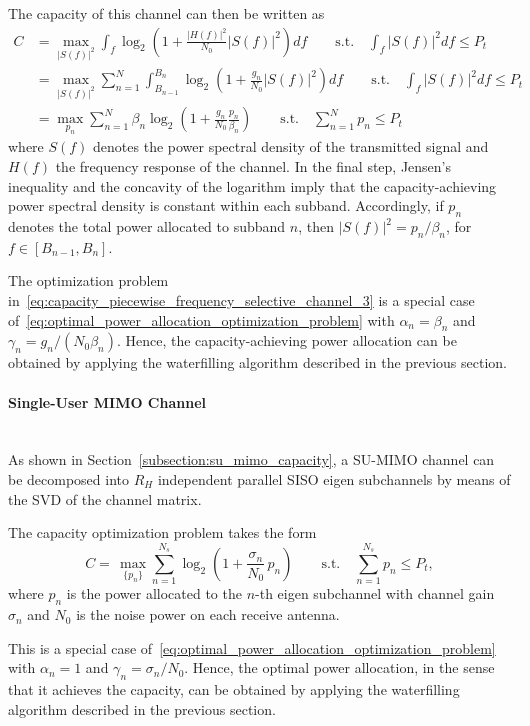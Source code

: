 The capacity of this channel can then be written as
\begin{subequations}
\label{eq:capacity_piecewise_frequency_selective_channel}
\begin{align}
    C
    &= \max_{|S(f)|^2} \int_f \log_2 \left( 1 + \frac{|H(f)|^2}{N_0} |S(f)|^2 \right) df
    \qquad \text{s.t.} \quad \int_f |S(f)|^2 df \leq P_t
    \label{eq:capacity_piecewise_frequency_selective_channel_1} \\
    &= \max_{|S(f)|^2} \sum_{n=1}^{N} \int_{B_{n-1}}^{B_n}
    \log_2 \left( 1 + \frac{g_n}{N_0} |S(f)|^2 \right) df
    \qquad \text{s.t.} \quad \int_f |S(f)|^2 df \leq P_t
    \label{eq:capacity_piecewise_frequency_selective_channel_2} \\
    &= \max_{p_n} \sum_{n=1}^{N} \beta_n \log_2 \left( 1 + \frac{g_n}{N_0} \frac{p_n}{\beta_n} \right)
    \qquad \text{s.t.} \quad \sum_{n=1}^{N} p_n \leq P_t
    \label{eq:capacity_piecewise_frequency_selective_channel_3}
\end{align}
\end{subequations}
where $S(f)$ denotes the power spectral density of the transmitted signal and $H(f)$ the frequency response of the channel.
In the final step, Jensen's inequality and the concavity of the logarithm imply that the capacity-achieving power spectral density is constant within each subband. Accordingly, if $p_n$ denotes the total power allocated to subband $n$, then $|S(f)|^2 = p_n / \beta_n$, for $f \in [B_{n-1}, B_n]$.

The optimization problem in~\eqref{eq:capacity_piecewise_frequency_selective_channel_3} is a special case of~\eqref{eq:optimal_power_allocation_optimization_problem} with $\alpha_n = \beta_n$ and $\gamma_n = g_n / (N_0 \beta_n)$.
Hence, the capacity-achieving power allocation can be obtained by applying the waterfilling algorithm described in the previous section.


\paragraph{Single-User MIMO Channel}~\\
As shown in Section~\ref{subsection:su_mimo_capacity}, a \ac{SU}-\ac{MIMO} channel can be decomposed into $R_H$ independent parallel \ac{SISO} eigen subchannels by means of the \ac{SVD} of the channel matrix.

The capacity optimization problem takes the form
\begin{equation*}
    C = \, \max_{\{p_n\}} \sum_{n=1}^{N_s} \log_2 \!\left( 1 + \frac{\sigma_n}{N_0} \, p_n \right)
    \qquad \text{s.t.} \quad \sum_{n=1}^{N_s} p_n \leq P_t,
\end{equation*}
where $p_n$ is the power allocated to the $n$-th eigen subchannel with channel gain $\sigma_n$ and $N_0$ is the noise power on each receive antenna.

This is a special case of~\eqref{eq:optimal_power_allocation_optimization_problem} with $\alpha_n = 1$ and $\gamma_n = \sigma_n / N_0$.
Hence, the optimal power allocation, in the sense that it achieves the capacity, can be obtained by applying the waterfilling algorithm described in the previous section.
